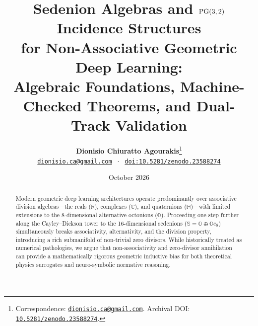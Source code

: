 \documentclass[11pt,a4paper]{article}
\title{\textbf{Sedenion Algebras and $\mathrm{PG}(3,2)$ Incidence Structures\\
for Non-Associative Geometric Deep Learning:\\
Algebraic Foundations, Machine-Checked Theorems, and Dual-Track Validation}}
\author{
  \textbf{Dionisio Chiuratto Agourakis}\thanks{Correspondence: \href{mailto:dionisio.ca@gmail.com}{\texttt{dionisio.ca@gmail.com}}. Archival DOI: \href{https://doi.org/10.5281/zenodo.23588274}{\texttt{10.5281/zenodo.23588274}}.} \\[0.4em]
  \small \href{mailto:dionisio.ca@gmail.com}{\texttt{dionisio.ca@gmail.com}} $\;\cdot\;$ \href{https://doi.org/10.5281/zenodo.23588274}{\texttt{doi:10.5281/zenodo.23588274}}
}
\date{October 2026}
\theoremstyle{definition}
\theoremstyle{remark}
\newcommand{\R}{\mathbb{R}}
\newcommand{\C}{\mathbb{C}}
\newcommand{\Ha}{\mathbb{H}}
\newcommand{\Oc}{\mathbb{O}}
\newcommand{\Se}{\mathbb{S}}
\begin{document}
\maketitle

\begin{abstract}
\noindent
Modern geometric deep learning architectures operate predominantly over associative division algebras---the reals ($\R$), complexes ($\C$), and quaternions ($\Ha$)---with limited extensions to the 8-dimensional alternative octonions ($\Oc$). Proceeding one step further along the Cayley--Dickson tower to the 16-dimensional sedenions ($\Se = \Oc \oplus \Oc e_8$) simultaneously breaks associativity, alternativity, and the division property, introducing a rich submanifold of non-trivial zero divisors. While historically treated as numerical pathologies, we argue that non-associativity and zero-divisor annihilation can provide a mathematically rigorous geometric inductive bias for both theoretical physics surrogates and neuro-symbolic normative reasoning. 


\end{abstract}
\end{document}
